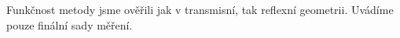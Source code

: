 Funkčnost metody jsme ověřili jak v transmisní, tak reflexní geometrii.
Uvádíme pouze finální sady měření.
